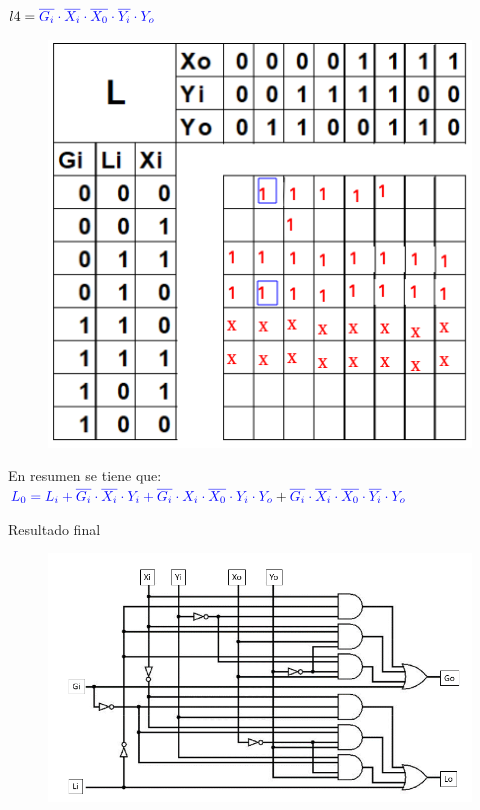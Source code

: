 \documentclass[12pt,letterpaper]{book}
\begin{document}
\begin{multicols}{2}
$l4=\textcolor{blue}{\overline{G_i} \cdot \overline{ X_i} \cdot \overline{X_0} \cdot \overline{Y_i}  \cdot Y_o}$
\begin{figure}[H]
\centering
\includegraphics[width=1\linewidth]{figures/k10.png}
\caption{}
\label{k10}
\end{figure}
\vspace{0.2cm}

En resumen se tiene que:\\
$\textcolor{blue}{L_0=L_i+\overline{G_i} \cdot \overline{X_i} \cdot Y_i+\overline{G_i} \cdot X_i \cdot \overline{X_0} \cdot Y_i \cdot Y_o }+\textcolor{blue}{\overline{G_i} \cdot \overline{ X_i} \cdot \overline{X_0} \cdot \overline{Y_i}  \cdot Y_o}$

Resultado final

\begin{figure}[H]
\centering
\includegraphics[width=1\linewidth]{figures/karnaugh.png}
\caption{}
\label{karnaugh}
\end{figure}
\vspace{0.2cm}

\end{multicols}
\end{document}
